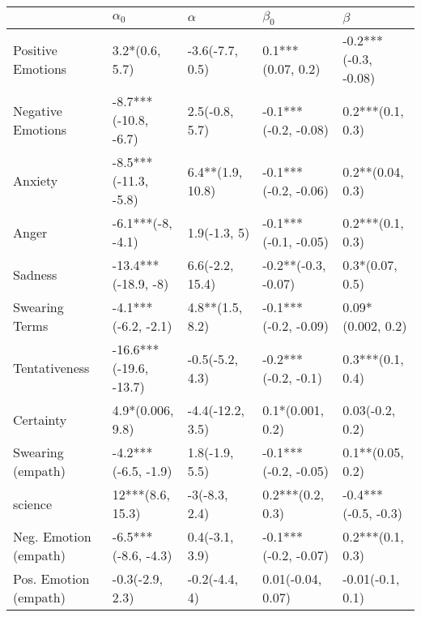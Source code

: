\begin{tabular}{lllll}
\toprule
{} &              $\alpha_0$ &          $\alpha$ &             $\beta_0$ &               $\beta$ \\
\midrule
Positive Emotions     &          3.2*(0.6, 5.7) &   -3.6(-7.7, 0.5) &     0.1***(0.07, 0.2) &  -0.2***(-0.3, -0.08) \\
Negative Emotions     &    -8.7***(-10.8, -6.7) &    2.5(-0.8, 5.7) &  -0.1***(-0.2, -0.08) &      0.2***(0.1, 0.3) \\
Anxiety               &    -8.5***(-11.3, -5.8) &  6.4**(1.9, 10.8) &  -0.1***(-0.2, -0.06) &      0.2**(0.04, 0.3) \\
Anger                 &       -6.1***(-8, -4.1) &      1.9(-1.3, 5) &  -0.1***(-0.1, -0.05) &      0.2***(0.1, 0.3) \\
Sadness               &     -13.4***(-18.9, -8) &   6.6(-2.2, 15.4) &   -0.2**(-0.3, -0.07) &       0.3*(0.07, 0.5) \\
Swearing Terms        &     -4.1***(-6.2, -2.1) &   4.8**(1.5, 8.2) &  -0.1***(-0.2, -0.09) &     0.09*(0.002, 0.2) \\
Tentativeness         &  -16.6***(-19.6, -13.7) &   -0.5(-5.2, 4.3) &   -0.2***(-0.2, -0.1) &      0.3***(0.1, 0.4) \\
Certainty             &        4.9*(0.006, 9.8) &  -4.4(-12.2, 3.5) &      0.1*(0.001, 0.2) &       0.03(-0.2, 0.2) \\
Swearing (empath)     &     -4.2***(-6.5, -1.9) &    1.8(-1.9, 5.5) &  -0.1***(-0.2, -0.05) &      0.1**(0.05, 0.2) \\
science               &        12***(8.6, 15.3) &     -3(-8.3, 2.4) &      0.2***(0.2, 0.3) &   -0.4***(-0.5, -0.3) \\
Neg. Emotion (empath) &     -6.5***(-8.6, -4.3) &    0.4(-3.1, 3.9) &  -0.1***(-0.2, -0.07) &      0.2***(0.1, 0.3) \\
Pos. Emotion (empath) &         -0.3(-2.9, 2.3) &     -0.2(-4.4, 4) &     0.01(-0.04, 0.07) &      -0.01(-0.1, 0.1) \\
\bottomrule
\end{tabular}

